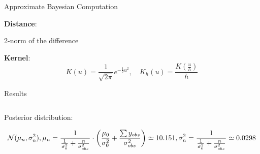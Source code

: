 \documentclass{beamer}
\begin{document}
\begin{section}{Approximate Bayesian Computation}
\begin{frame}
{\textbf{Distance}: 
\begin{center}
	2-norm of the difference
\end{center}   %

\textbf{Kernel}: 
$$
K(u) = 
\frac{1}{\sqrt{2\pi}} e^{-\frac{1}{2}u^2}, 
\quad K_h(u) 
= \frac{K(\frac u h)}{h}

$$
}
\end{frame}


\begin{frame}{Results}


\begin{columns}
	


\begin{column}{0.5\textwidth}


	{\small
		Posterior distribution:
		
		$$
		\mathcal{N}(\mu_n, \sigma^2_n), 
		
		\vspace{0.3cm}
		\mu_n 
		= \frac{1}{ \frac{1}{\sigma_0^2} + \frac{n}{\sigma_{obs}^2} } 
		\cdot \left(\frac{\mu_0}{\sigma_0^2} + \frac{\sum y_{obs}}{\sigma_{obs}^2}\right)
		\simeq 10.151,
		
		\vspace{0.3cm}
		\sigma^2_n
		= \frac{1}{ \frac{1}{\sigma_0^2} + \frac{n}{\sigma_{obs}^2} } 
		\simeq 0.0298
		$$
	}
\end{column}


\end{columns}
\end{frame}
\end{section}
\end{document}
